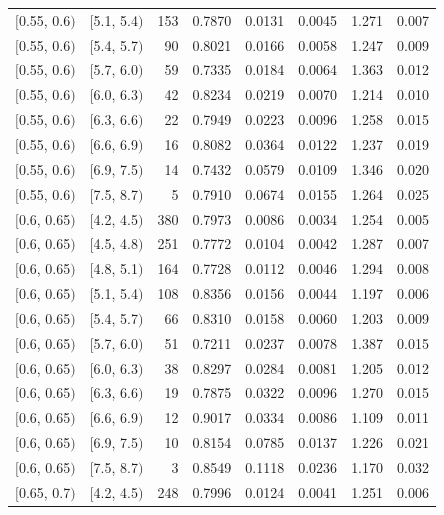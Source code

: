 \documentclass[11pt]{article}
\begin{document}
\begin{longtable}{| l | l | r | r | r | r | r | r |}
        $[$0.55, 0.6$)$ & $[$5.1, 5.4$)$ & 153 & 0.7870 & 0.0131 & 0.0045 & 1.271 & 0.007 \\
        $[$0.55, 0.6$)$ & $[$5.4, 5.7$)$ & 90 & 0.8021 & 0.0166 & 0.0058 & 1.247 & 0.009 \\
        $[$0.55, 0.6$)$ & $[$5.7, 6.0$)$ & 59 & 0.7335 & 0.0184 & 0.0064 & 1.363 & 0.012 \\
        $[$0.55, 0.6$)$ & $[$6.0, 6.3$)$ & 42 & 0.8234 & 0.0219 & 0.0070 & 1.214 & 0.010 \\
        $[$0.55, 0.6$)$ & $[$6.3, 6.6$)$ & 22 & 0.7949 & 0.0223 & 0.0096 & 1.258 & 0.015 \\
        $[$0.55, 0.6$)$ & $[$6.6, 6.9$)$ & 16 & 0.8082 & 0.0364 & 0.0122 & 1.237 & 0.019 \\
        $[$0.55, 0.6$)$ & $[$6.9, 7.5$)$ & 14 & 0.7432 & 0.0579 & 0.0109 & 1.346 & 0.020 \\
        $[$0.55, 0.6$)$ & $[$7.5, 8.7$)$ & 5 & 0.7910 & 0.0674 & 0.0155 & 1.264 & 0.025 \\
        $[$0.6, 0.65$)$ & $[$4.2, 4.5$)$ & 380 & 0.7973 & 0.0086 & 0.0034 & 1.254 & 0.005 \\
        $[$0.6, 0.65$)$ & $[$4.5, 4.8$)$ & 251 & 0.7772 & 0.0104 & 0.0042 & 1.287 & 0.007 \\
        $[$0.6, 0.65$)$ & $[$4.8, 5.1$)$ & 164 & 0.7728 & 0.0112 & 0.0046 & 1.294 & 0.008 \\
        $[$0.6, 0.65$)$ & $[$5.1, 5.4$)$ & 108 & 0.8356 & 0.0156 & 0.0044 & 1.197 & 0.006 \\
        $[$0.6, 0.65$)$ & $[$5.4, 5.7$)$ & 66 & 0.8310 & 0.0158 & 0.0060 & 1.203 & 0.009 \\
        $[$0.6, 0.65$)$ & $[$5.7, 6.0$)$ & 51 & 0.7211 & 0.0237 & 0.0078 & 1.387 & 0.015 \\
        $[$0.6, 0.65$)$ & $[$6.0, 6.3$)$ & 38 & 0.8297 & 0.0284 & 0.0081 & 1.205 & 0.012 \\
        $[$0.6, 0.65$)$ & $[$6.3, 6.6$)$ & 19 & 0.7875 & 0.0322 & 0.0096 & 1.270 & 0.015 \\
        $[$0.6, 0.65$)$ & $[$6.6, 6.9$)$ & 12 & 0.9017 & 0.0334 & 0.0086 & 1.109 & 0.011 \\
        $[$0.6, 0.65$)$ & $[$6.9, 7.5$)$ & 10 & 0.8154 & 0.0785 & 0.0137 & 1.226 & 0.021 \\
        $[$0.6, 0.65$)$ & $[$7.5, 8.7$)$ & 3 & 0.8549 & 0.1118 & 0.0236 & 1.170 & 0.032 \\
        $[$0.65, 0.7$)$ & $[$4.2, 4.5$)$ & 248 & 0.7996 & 0.0124 & 0.0041 & 1.251 & 0.006 \\

\end{longtable}
\end{document}
